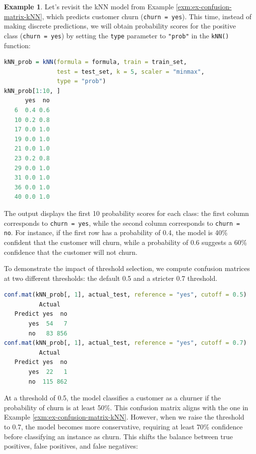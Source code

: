 \documentclass[
]{book}
\newcommand{\passthrough}[1]{#1}
\theoremstyle{definition}
\theoremstyle{definition}
\newtheorem{example}{Example}[chapter]
\theoremstyle{definition}
\theoremstyle{definition}
\theoremstyle{remark}
\begin{document}
\begin{example}
\protect\hypertarget{exm:ex-confusion-matrix-kNN-prob}{}\label{exm:ex-confusion-matrix-kNN-prob}Let's revisit the kNN model from Example \ref{exm:ex-confusion-matrix-kNN}, which predicts customer churn (\passthrough{\lstinline!churn = yes!}). This time, instead of making discrete predictions, we will obtain probability scores for the positive class (\passthrough{\lstinline!churn = yes!}) by setting the \passthrough{\lstinline!type!} parameter to \passthrough{\lstinline!"prob"!} in the \passthrough{\lstinline!kNN()!} function:

\begin{lstlisting}[language=R]
kNN_prob = kNN(formula = formula, train = train_set, 
               test = test_set, k = 5, scaler = "minmax",
               type = "prob")
kNN_prob[1:10, ]
      yes  no
   6  0.4 0.6
   10 0.2 0.8
   17 0.0 1.0
   19 0.0 1.0
   21 0.0 1.0
   23 0.2 0.8
   29 0.0 1.0
   31 0.0 1.0
   36 0.0 1.0
   40 0.0 1.0
\end{lstlisting}

The output displays the first 10 probability scores for each class: the first column corresponds to \passthrough{\lstinline!churn = yes!}, while the second column corresponds to \passthrough{\lstinline!churn = no!}. For instance, if the first row has a probability of 0.4, the model is 40\% confident that the customer will churn, while a probability of 0.6 suggests a 60\% confidence that the customer will not churn.

To demonstrate the impact of threshold selection, we compute confusion matrices at two different thresholds: the default 0.5 and a stricter 0.7 threshold.

\begin{lstlisting}[language=R]
conf.mat(kNN_prob[, 1], actual_test, reference = "yes", cutoff = 0.5)
          Actual
   Predict yes  no
       yes  54   7
       no   83 856
conf.mat(kNN_prob[, 1], actual_test, reference = "yes", cutoff = 0.7)
          Actual
   Predict yes  no
       yes  22   1
       no  115 862
\end{lstlisting}

At a threshold of 0.5, the model classifies a customer as a churner if the probability of churn is at least 50\%. This confusion matrix aligns with the one in Example \ref{exm:ex-confusion-matrix-kNN}. However, when we raise the threshold to 0.7, the model becomes more conservative, requiring at least 70\% confidence before classifying an instance as churn. This shifts the balance between true positives, false positives, and false negatives:


\end{example}
\end{document}
